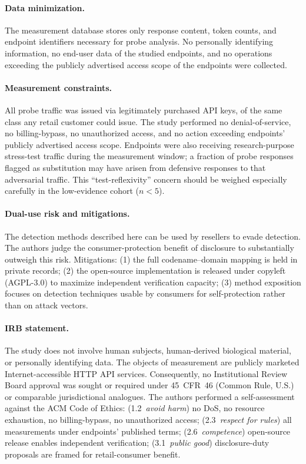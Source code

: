 \documentclass[10pt,a4paper,twocolumn]{article}
\begin{document}
\paragraph{Data minimization.}
The measurement database stores only response content, token counts, and
endpoint identifiers necessary for probe analysis. No personally
identifying information, no end-user data of the studied endpoints, and no
operations exceeding the publicly advertised access scope of the endpoints
were collected.

\paragraph{Measurement constraints.}
All probe traffic was issued via legitimately purchased API keys, of the
same class any retail customer could issue. The study performed no
denial-of-service, no billing-bypass, no unauthorized access, and no action
exceeding endpoints' publicly advertised access scope. Endpoints were also
receiving research-purpose stress-test traffic during the measurement
window; a fraction of probe responses flagged as substitution may have
arisen from defensive responses to that adversarial traffic. This
``test-reflexivity'' concern should be weighed especially carefully in the
low-evidence cohort ($n{<}5$).

\paragraph{Dual-use risk and mitigations.}
The detection methods described here can be used by resellers to evade
detection. The authors judge the consumer-protection benefit of disclosure
to substantially outweigh this risk. Mitigations: (1) the full
codename--domain mapping is held in private records; (2) the open-source
implementation is released under copyleft (AGPL-3.0) to maximize
independent verification capacity; (3) method exposition focuses on
detection techniques usable by consumers for self-protection rather than on
attack vectors.

\paragraph{IRB statement.}
The study does not involve human subjects, human-derived biological
material, or personally identifying data. The objects of measurement are
publicly marketed Internet-accessible HTTP API services. Consequently, no
Institutional Review Board approval was sought or required under
45~CFR~46 (Common Rule, U.S.) or comparable jurisdictional analogues. The
authors performed a self-assessment against the ACM Code of Ethics:
(1.2~\emph{avoid harm}) no DoS, no resource exhaustion, no billing-bypass,
no unauthorized access; (2.3~\emph{respect for rules}) all measurements
under endpoints' published terms; (2.6~\emph{competence}) open-source
release enables independent verification; (3.1~\emph{public good})
disclosure-duty proposals are framed for retail-consumer benefit.
\end{document}
